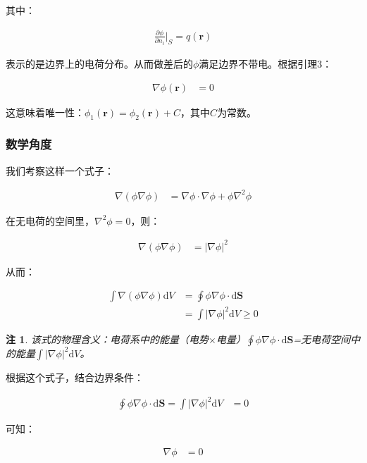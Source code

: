 \documentclass[12pt,onecolumn,a4paper]{book}
\newtheorem*{note}{注}
\numberwithin{table}{subsection}
\numberwithin{equation}{subsection}
\begin{document}
其中：

\begin{align}
    \frac{\partial \phi}{\partial n_i}|_S=q(\mathbf{r})
\end{align}

表示的是边界上的电荷分布。从而做差后的$\phi$满足边界不带电。根据引理3：

\begin{align}
    \nabla \phi(\mathbf{r}) & = 0
\end{align}

这意味着唯一性：$\phi_1(\mathbf{r})=\phi_2(\mathbf{r})+C$，其中$C$为常数。

\subsubsection{数学角度}

我们考察这样一个式子：

\begin{align}
    \nabla(\phi \nabla \phi) & = \nabla \phi \cdot \nabla \phi + \phi \nabla^2 \phi
\end{align}

在无电荷的空间里，$\nabla^2 \phi = 0$，则：

\begin{align}
    \nabla(\phi \nabla \phi) & = |\nabla \phi|^2
\end{align}

从而：

\begin{align}
    \int \nabla(\phi \nabla \phi) \mathrm{d} V & = \oint \phi \nabla \phi \cdot \mathrm{d} \mathbf{S} \\
                                               & = \int |\nabla \phi|^2 \mathrm{d} V \geqslant 0
\end{align}

\begin{note}
    该式的物理含义：电荷系中的能量（电势$\times$电量）$\oint \phi \nabla \phi \cdot \mathrm{d} \mathbf{S}$=无电荷空间中的能量$\int |\nabla \phi|^2 \mathrm{d} V$。
\end{note}

根据这个式子，结合边界条件：

\begin{align}
    \oint \phi \nabla \phi \cdot \mathrm{d} \mathbf{S} = \int |\nabla \phi|^2 \mathrm{d} V & = 0
\end{align}

可知：

\begin{align}
    \nabla \phi & = 0
\end{align}
\end{document}
